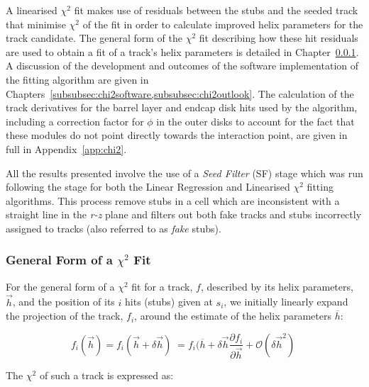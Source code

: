 A linearised $\chi^{2}$ fit makes use of residuals between the stubs and the seeded track that minimise $\chi^{2}$ of the fit in order to calculate improved helix parameters for the track candidate.
The general form of the $\chi^{2}$ fit describing how these hit residuals are used to obtain a fit of a track's helix parameters is detailed in Chapter~\ref{subsubsec:chi2maths}.
A discussion of the development and outcomes of the software implementation of the fitting algorithm are given in Chapters~\ref{subsubsec:chi2software,subsubsec:chi2outlook}.
The calculation of the track derivatives for the barrel layer and endcap disk hits used by the algorithm, including a correction factor for $\phi$ in the outer disks to account for the fact that these modules do not point directly towards the interaction point, are given in full in Appendix~\ref{app:chi2}.

All the results presented involve the use of a \emph{Seed Filter} (SF) stage which was run following the \HT stage for both the Linear Regression and Linearised $\chi^{2}$ fitting algorithms.
This process remove stubs in a \HT cell which are inconsistent with a straight line in the \emph{r-z} plane and filters out both fake tracks and stubs incorrectly assigned to tracks (also referred to as \emph{fake} stubs).

\subsubsection{General Form of a $\chi^{2}$ Fit}\label{subsubsec:chi2maths}
For the general form of a $\chi^{2}$ fit for a track, $f$, described by its helix parameters, $\overrightarrow{h}$, and 
the position of its $i$ hits (\ie stubs) given at $s_{i}$, we initially linearly expand the projection of the track, $f_{i}$, around the estimate of the helix parameters $\overline{h}$:

\begin{equation}
f_{i}(\overrightarrow{h} ) = f_{i}(\overrightarrow{h} + \delta \overrightarrow{h}) \;
                           = f_{i}(\overline{h} + \delta \overrightarrow{h} \frac{\partial f_{i}}{\partial \overrightarrow{h}} + \mathcal{O}(\delta \overrightarrow{h}^{2}) \;
\label{eq:chi1}
\end{equation}

The $\chi^{2}$ of such a track is expressed as:

